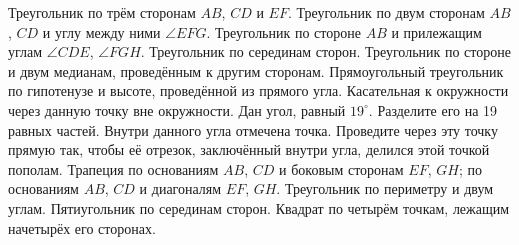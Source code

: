 \documentclass[a4paper,12pt]{article}
\begin{document}
    \problem Треугольник по трём сторонам $AB$, $CD$ и $EF$.
    \problem Треугольник по двум сторонам $AB$, $CD$ и углу между ними $\angle EFG$.
    \problem Треугольник по стороне $AB$ и прилежащим углам $\angle CDE$, $\angle FGH$.
    \problem Треугольник по серединам сторон.
    \problem Треугольник по стороне и двум медианам, проведённым к другим сторонам.
    \problem Прямоугольный треугольник по гипотенузе и высоте, проведённой из прямого угла.
    \problem Касательная к окружности через данную точку вне окружности.
    \problem Дан угол, равный $19^\circ$. Разделите его на 19 равных частей.
    \problem Внутри данного угла отмечена точка. Проведите через эту точку прямую так, чтобы её отрезок, заключённый внутри угла, делился этой точкой пополам.
    \problem Трапеция \sub по основаниям $AB$, $CD$ и боковым сторонам $EF$, $GH$; \sub по основаниям $AB$, $CD$ и диагоналям $EF$, $GH$.
    \problem Треугольник по периметру и двум углам.
    \problem Пятиугольник по серединам сторон.
    \problem Квадрат по четырём точкам, лежащим начетырёх его сторонах.
    
\end{document}
